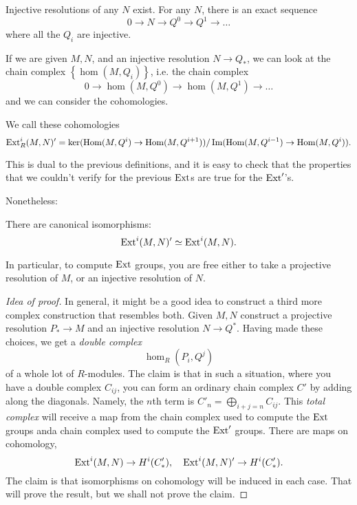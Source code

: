 \begin{corollary} 
Injective resolutions of any $N$ exist. For any $N$, there is an
exact sequence
\[ 0 \to N \to Q^0 \to Q^1 \to \dots  \]
where all the $Q_i$ are injective.
\end{corollary} 

If we are given $M,N$, and an injective resolution $N \to Q_*$,
we can look at
the chain complex $\left\{\hom(M,Q_i)\right\}$, i.e. the chain
complex
\[ 0 \to \hom(M, Q^0) \to \hom(M, Q^1) \to \dots  \]
and we can consider the cohomologies.

\begin{definition} 
We call these cohomologies
\[ \mathrm{Ext}^i_R(M,N)' = \ker(\operatorname{Hom}(M, Q^i) \to \operatorname{Hom}(M,
Q^{i+1}))/\operatorname{Im}(\operatorname{Hom}(M,
Q^{i-1}) \to \operatorname{Hom}(M, Q^i)).  \]
\end{definition} 

This is dual to the previous definitions, and it is easy to
check that the
properties that we couldn't verify for the previous $\mathrm{Ext}$s are
true for the
$\mathrm{Ext}'$'s. 

Nonetheless:

\begin{theorem} 
There are canonical isomorphisms:
\[ \mathrm{Ext}^i(M,N)' \simeq \mathrm{Ext}^i(M,N).  \]
\end{theorem} 

In particular, to compute $\mathrm{Ext}$ groups, you are free either to
take a
projective resolution of $M$, or an injective resolution of
$N$.\begin{proof}[Idea of proof]
In general, it might be a good idea to construct a third more
complex
construction that resembles both. Given $M,N$ construct a
projective resolution
$P_* \to M$ and an injective resolution $N \to Q^*$. Having made
these choices,
we get a \emph{double complex}
\[ \hom_R(P_i, Q^j)  \]
of a whole lot of $R$-modules. The claim is that in such a
situation, where
you have a double complex $C_{ij}$, you can
form an ordinary chain complex $C'$
by adding along the diagonals. Namely, the $n$th term 
is $C'_n = \bigoplus_{i+j=n} C_{ij}$. This \emph{total complex}
will receive a
map from the chain complex used to compute the $\mathrm{Ext}$ groups
anda chain
complex used to compute the $\mathrm{Ext}'$ groups. There are maps on
cohomology,
\[ \mathrm{Ext}^i(M,N) \to H^i(C'_*), \quad \mathrm{Ext}^i(M,N)' \to H^i(C'_*).
\]
The claim is that isomorphisms on
cohomology will be induced in each case. That will prove the
result, but we
shall not prove the claim.
\end{proof} 

